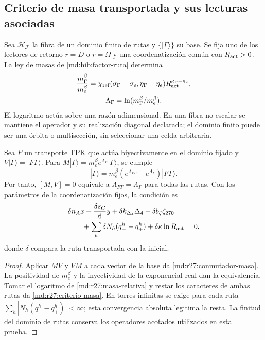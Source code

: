\subsection{Criterio de masa transportada y sus lecturas asociadas}
Sea $\mathcal H_{\mathcal F}$ la fibra de un dominio finito de rutas y
$\{|\Gamma\rangle\}$ su base. Se fija uno de los lectores de retorno
$r=D$ o $r=\Omega$ y una coordenatización común con $R_{\rm act}>0$.
La ley de masas de \eqref{md:hib:factor-ruta} determina
\begin{equation}
 \begin{gathered}
 \frac{m_\Gamma^\beta}{m_e^\beta}
 =\chi_{\rm ref}(\sigma_\Gamma-\sigma_e,\eta_\Gamma-\eta_e)
 R_{\rm act}^{\kappa_\Gamma-\kappa_e},\\
 \Lambda_\Gamma=\ln(m_\Gamma^\beta/m_e^\beta).
 \end{gathered}
 \label{md:r27:masa-relativa}
\end{equation}
El logaritmo actúa sobre una razón adimensional. En una fibra no escalar
se mantiene el operador y su realización diagonal declarada; el dominio
finito puede ser una órbita o multisección, sin seleccionar una celda arbitraria.

\begin{theorem}
Sea $F$ un transporte TPK que actúa biyectivamente en el dominio fijado y
$V|\Gamma\rangle=|F\Gamma\rangle$. Para
$M|\Gamma\rangle=m_e^\beta e^{\Lambda_\Gamma}|\Gamma\rangle$, se cumple
\begin{equation}
 [M,V]|\Gamma\rangle=m_e^\beta
 (e^{\Lambda_{F\Gamma}}-e^{\Lambda_\Gamma})|F\Gamma\rangle.
 \label{md:r27:conmutador-masa}
\end{equation}
Por tanto, $[M,V]=0$ equivale a $\Lambda_{F\Gamma}=\Lambda_\Gamma$ para
todas las rutas. Con los parámetros de la coordenatización fijos, la condición es
\begin{equation}
 \begin{aligned}
 &\delta n_A x+\frac{\delta s_C}{6}y+
 \delta k_{\Delta_4}\Delta_4+\delta b_\zeta\zeta_{270}\\
 &\qquad+\sum_h\delta N_h(q_-^h-q_+^h)
 +\delta\kappa\ln R_{\rm act}=0,
 \end{aligned}
 \label{md:r27:criterio-masa}
\end{equation}
donde $\delta$ compara la ruta transportada con la inicial.
\end{theorem}
\begin{proof}
Aplicar $MV$ y $VM$ a cada vector de la base da
\eqref{md:r27:conmutador-masa}. La positividad de $m_e^\beta$ y la
inyectividad de la exponencial real dan la equivalencia. Tomar el logaritmo
de \eqref{md:r27:masa-relativa} y restar los caracteres de ambas rutas da
\eqref{md:r27:criterio-masa}. En torres infinitas se exige para cada ruta
$\sum_h|N_h(q_-^h-q_+^h)|<\infty$; esta convergencia absoluta legitima
la resta. La finitud del dominio de rutas conserva los operadores acotados
utilizados en esta prueba.
\end{proof}

